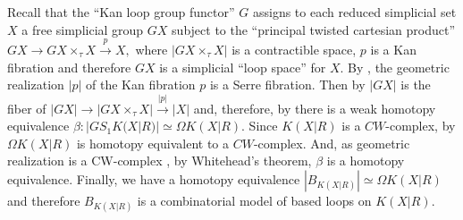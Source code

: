 \documentclass[11pt,a4paper]{article}
\newtheorem{lemma}[theorem]{Lemma}
\begin{document}
Recall that the ``Kan loop group functor'' $G$ assigns to each reduced simplicial set $X$ a free simplicial group $GX$ subject to the ``principal twisted cartesian product'' \cite[Theorem 26.6]{May}
$GX\rightarrow GX \times_{\tau} X \xrightarrow{p} X,$
where $|GX \times_{\tau} X|$ is a contractible space, $p$ is a Kan fibration and therefore $GX$ is a simplicial ``loop space'' for $X$.
By \cite[Theorem 10.10]{GJ}, the geometric realization $|p|$ of the Kan fibration $p$ is a Serre fibration. Then by \cite[Theorem 10.9]{GJ} $|GX|$ is the fiber of 
$|GX|\rightarrow |GX \times_{\tau} X| \xrightarrow{|p|} |X|$
and, therefore, by \cite[Proposition 4.66]{Hut} there is a weak homotopy equivalence $\beta:|GS_1K(X|R)|\simeq \Omega K(X|R)$.
Since $K(X|R)$ is a $CW$-complex, by \cite[Corollary 2]{Milnor} $\Omega K(X|R)$ is homotopy equivalent to a $CW$-complex.
And, as geometric realization is a CW-complex \cite[Theorem 14.1]{May}, by Whitehead's theorem, $\beta$ is a homotopy equivalence. Finally, we have a homotopy equivalence $|B_{K(X|R)}|\simeq \Omega K(X|R)$ and therefore $B_{K(X|R)}$ is a combinatorial model of based loops on $K(X|R)$.





\end{document}
